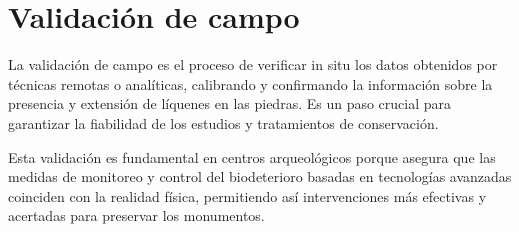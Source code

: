 \section{Validación de campo}

La validación de campo es el proceso de verificar in situ los datos obtenidos por técnicas remotas o analíticas, calibrando y confirmando la información sobre la presencia y extensión de líquenes en las piedras. Es un paso crucial para garantizar la fiabilidad de los estudios y tratamientos de conservación.

Esta validación es fundamental en centros arqueológicos porque asegura que las medidas de monitoreo y control del biodeterioro basadas en tecnologías avanzadas coinciden con la realidad física, permitiendo así intervenciones más efectivas y acertadas para preservar los monumentos.

